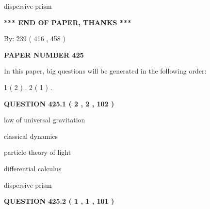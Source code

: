 \documentclass[12pt]{article}
\begin{document}
 
dispersive prism
 
 
 
 
   
   
\vspace{1.0in} 
{\textbf{\large{ *** END OF PAPER, THANKS *** }}} 
   
   
\hspace{1.0in} By: 
 239 ( 416 ,  458 )
   
   
   
   
\newpage 
\setcounter{page}{ 
   425001 } 
   
   
   
   
 {\textbf{ \Large{ PAPER NUMBER  425  }}}
   
   
\vspace{0.2in}
   
   
   
   
   
\vspace{0.2in}
   
In this paper, big questions will be generated in the following order: 
   
   
   1 ( 2 )
 ,
   2 ( 1 )
 .
  
\vspace{0.2in}
  
{\textbf{\Large{QUESTION
425.1 
 ( 2 , 2 , 102 )
}}}
  
  
 
 
\noindent{}
 
 
law of universal gravitation
 
 
classical dynamics
 
 
particle theory of light
 
 
differential calculus
 
 
dispersive prism
 
 
 
 
  
\vspace{0.2in}
  
{\textbf{\Large{QUESTION
425.2 
 ( 1 , 1 , 101 )
}}}
  
  
 
\end{document}
